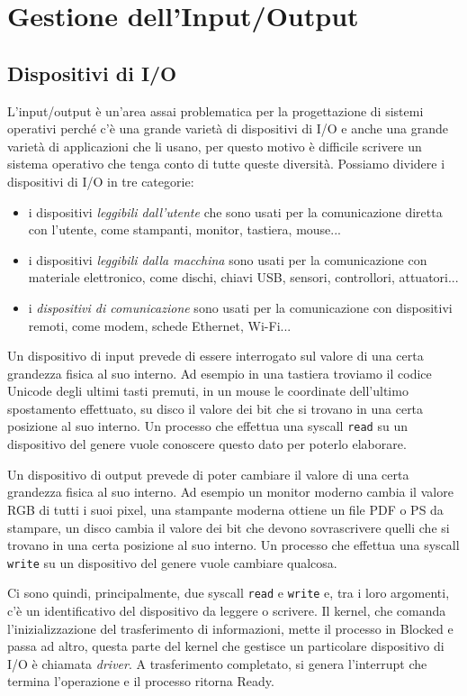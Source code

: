 \chapter{Gestione dell'Input/Output}

\section{Dispositivi di I/O}
L'input/output è un'area assai problematica per la progettazione di sistemi operativi perché c'è una grande varietà di dispositivi di I/O e anche una grande varietà di applicazioni che li usano, per questo motivo è difficile scrivere un sistema operativo che tenga conto di tutte queste diversità. Possiamo dividere i dispositivi di I/O in tre categorie: 
\begin{itemize}
    \item i dispositivi \textit{leggibili dall'utente} che sono usati per la comunicazione diretta con l'utente, come stampanti, monitor, tastiera, mouse...
    \item i dispositivi \textit{leggibili dalla macchina} sono usati per la comunicazione con materiale elettronico, come dischi, chiavi USB, sensori, controllori, attuatori...
    \item i \textit{dispositivi di comunicazione} sono usati per la comunicazione con dispositivi remoti, come modem, schede Ethernet, Wi-Fi...
\end{itemize}

Un dispositivo di input prevede di essere interrogato sul valore di una certa grandezza fisica al suo interno. Ad esempio in una tastiera troviamo il codice Unicode degli ultimi tasti premuti, in un mouse le coordinate dell'ultimo spostamento effettuato, su disco il valore dei bit che si trovano in una certa posizione al suo interno. Un processo che effettua una syscall \verb|read| su un dispositivo del genere vuole conoscere questo dato per poterlo elaborare.

Un dispositivo di output prevede di poter cambiare il valore di una certa grandezza fisica al suo interno. Ad esempio un monitor moderno cambia il valore RGB di tutti i suoi pixel, una stampante moderna ottiene un file PDF o PS da stampare, un disco cambia il valore dei bit che devono sovrascrivere quelli che si trovano in una certa posizione al suo interno. Un processo che effettua una syscall \verb|write| su un dispositivo del genere vuole cambiare qualcosa.

Ci sono quindi, principalmente, due syscall \verb|read| e \verb|write| e, tra i loro argomenti, c'è un identificativo del dispositivo da leggere o scrivere. Il kernel, che comanda l'inizializzazione del trasferimento di informazioni, mette il processo in Blocked e passa ad altro, questa parte del kernel che gestisce un particolare dispositivo di I/O è chiamata \textit{driver}. A trasferimento completato, si genera l'interrupt che termina l'operazione e il processo ritorna Ready.

